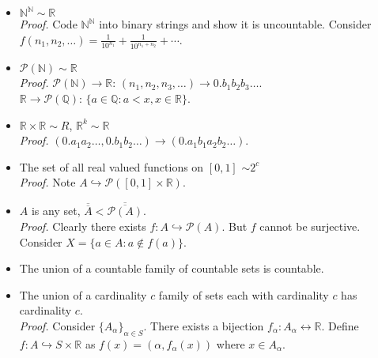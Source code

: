 \documentclass[%
 aip,
 jmp,%
 amsmath,amssymb,
 reprint,%
]{revtex4-1}
\def\R{{\mathbb R}}
\def\Q{{\mathbb Q}}
\def\N{{\mathbb N}}
\def\a{\alpha}
\renewenvironment{proof}{\color{gray}\footnotesize\emph{Proof.}}{}
\newcommand{\card}[1]{\overline{\overline{#1}}}
\newcommand{\inject}{\hookrightarrow}
\newcommand{\power}[1]{\mathcal P(#1)}
\begin{document}
\begin{enumerate}
\begin{itemize}
      \item $\N^{\N} \sim \R$ \\
        \begin{proof}
          Code $\N^{\N}$ into binary strings and show it is uncountable. Consider
          $f(n_1, n_2, \dots) = \frac{1}{10^{n_1}}+\frac{1}{10^{n_1+n_2}}+\cdots$.
        \end{proof}

      \item $\power{\N} \sim \R$ \\
          \begin{proof}
            $\power{\N} \to \R$: $(n_1,n_2,n_3,\dots) \to 0.b_1b_2b_3\dots $.\\
            $\R \to \power{\Q}$: $\{a \in \Q: a < x, x \in \R\}$.
          \end{proof}

      \item $\R\times\R \sim R$, $\R^k \sim \R$ \\
          \begin{proof}
           $(0.a_1a_2\dots, 0.b_1b_2\dots) \to (0.a_1b_1a_2b_2\dots)$.
          \end{proof}

      \item The set of all real valued functions on $[0,1]$ $\sim 2^c$ \\
          \begin{proof}
            Note $A \inject \power{[0,1]\times\R}$.
          \end{proof}

      \item $A$ is any set, $\card{A} < \card{\power{A}}$.\\
          \begin{proof}
            Clearly there exists $f: A \inject \power{A}$.
            But $f$ cannot be surjective. Consider
            $X = \{ a \in A: a \notin f(a) \}$.
          \end{proof}

      \item The union of a countable family of countable sets is countable.
      \item The union of a cardinality $c$ family of sets each with cardinality
      $c$ has cardinality $c$.\\
          \begin{proof}
            Consider $\{A_{\a}\}_{\a\in S}$.
            There exists a bijection $f_{\a}: A_{\a} \leftrightarrow \R$.
            Define $f: A \inject S\times\R$ as $f(x) = (\a, f_{\a}(x))$ where $x\in A_{\a}$.
          \end{proof}
    \end{itemize}

\end{enumerate}
\end{document}

